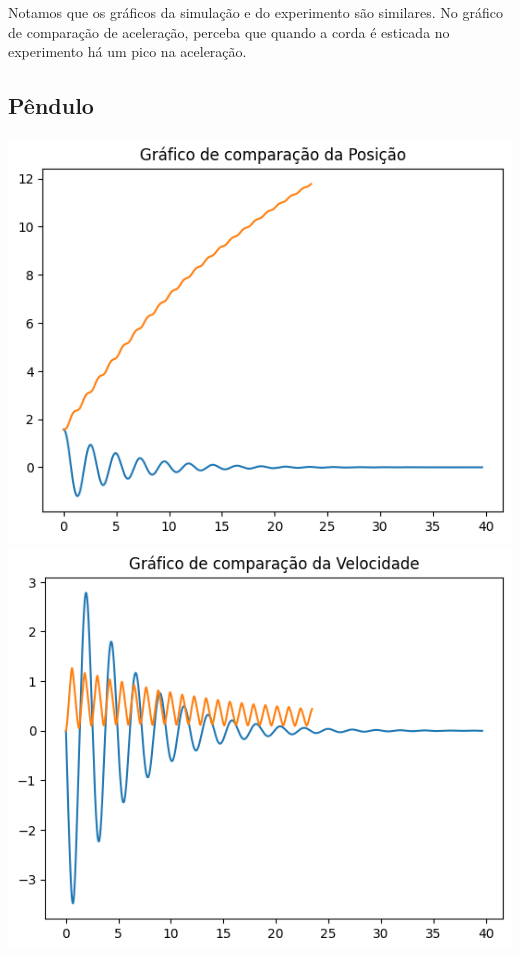 \documentclass{article}
\begin{document}
Notamos que os gráficos da simulação e do experimento são similares. No gráfico de comparação de aceleração, perceba que quando a corda é esticada no experimento há um pico na aceleração.

\subsection{Pêndulo}

\includegraphics{P-comparacao-posicao.png}\\
\includegraphics{P-comparacao-velocidade.png}\\
\end{document}
